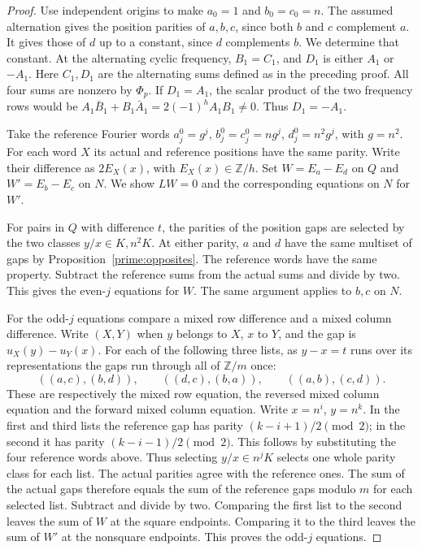 \documentclass[11pt,a4paper]{article}
\numberwithin{equation}{section}
\begin{document}
\begin{proof}
Use independent origins to make $a_0=1$ and $b_0=c_0=n$. The assumed alternation gives the position parities of $a,b,c$, since both $b$ and $c$ complement $a$. It gives those of $d$ up to a constant, since $d$ complements $b$. We determine that constant. At the alternating cyclic frequency, $B_1=C_1$, and $D_1$ is either $A_1$ or $-A_1$. Here $C_1,D_1$ are the alternating sums defined as in the preceding proof. All four sums are nonzero by $\Phi_p$. If $D_1=A_1$, the scalar product of the two frequency rows would be $A_1\bar B_1+B_1\bar A_1=2(-1)^h A_1B_1\ne0$. Thus $D_1=-A_1$.

Take the reference Fourier words $a^0_j=g^j$, $b^0_j=c^0_j=ng^j$, $d^0_j=n^2g^j$, with $g=n^2$. For each word $X$ its actual and reference positions have the same parity. Write their difference as $2E_X(x)$, with $E_X(x)\in\mathbb Z/h$. Set $W=E_a-E_d$ on $Q$ and $W'=E_b-E_c$ on $N$. We show $LW=0$ and the corresponding equations on $N$ for $W'$.

For pairs in $Q$ with difference $t$, the parities of the position gaps are selected by the two classes $y/x\in K,n^2K$. At either parity, $a$ and $d$ have the same multiset of gaps by Proposition~\ref{prime:opposites}. The reference words have the same property. Subtract the reference sums from the actual sums and divide by two. This gives the even-$j$ equations for $W$. The same argument applies to $b,c$ on $N$.

For the odd-$j$ equations compare a mixed row difference and a mixed column difference. Write $(X,Y)$ when $y$ belongs to $X$, $x$ to $Y$, and the gap is $u_X(y)-u_Y(x)$. For each of the following three lists, as $y-x=t$ runs over its representations the gaps run through all of $\mathbb Z/m$ once:
\[
 ((a,c),(b,d)),\qquad ((d,c),(b,a)),\qquad ((a,b),(c,d)).
\]
These are respectively the mixed row equation, the reversed mixed column equation and the forward mixed column equation. Write $x=n^i$, $y=n^k$. In the first and third lists the reference gap has parity $(k-i+1)/2\pmod2$; in the second it has parity $(k-i-1)/2\pmod2$. This follows by substituting the four reference words above. Thus selecting $y/x\in n^jK$ selects one whole parity class for each list. The actual parities agree with the reference ones. The sum of the actual gaps therefore equals the sum of the reference gaps modulo $m$ for each selected list. Subtract and divide by two. Comparing the first list to the second leaves the sum of $W$ at the square endpoints. Comparing it to the third leaves the sum of $W'$ at the nonsquare endpoints. This proves the odd-$j$ equations.


\end{proof}
\end{document}
